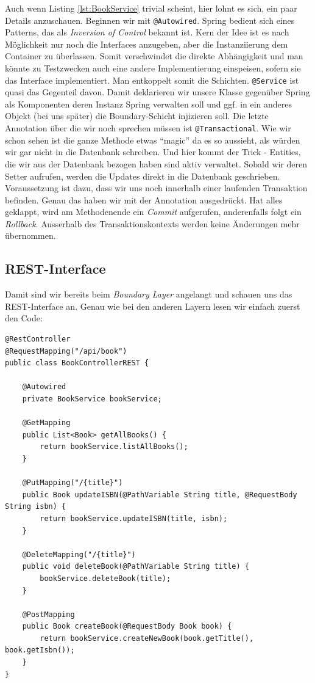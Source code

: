 Auch wenn Listing \ref{lst:BookService} trivial scheint, 
hier lohnt es sich, ein paar Details
anzuschauen. Beginnen wir mit \texttt{@Autowired}. Spring bedient sich
eines Patterns, das als \textit{Inversion of Control} \cite{fowler_2004} 
bekannt ist. Kern der Idee ist es nach Möglichkeit nur noch die Interfaces
anzugeben, aber die Instanziierung dem Container zu überlassen. Somit
verschwindet die direkte Abhängigkeit und man könnte zu Testzwecken 
auch eine andere Implementierung einspeisen, sofern sie das Interface
implementiert. Man entkoppelt somit die Schichten.
\texttt{@Service} ist quasi das Gegenteil davon. Damit deklarieren wir 
unsere Klasse gegenüber Spring als Komponenten deren Instanz Spring
verwalten soll und ggf. in ein anderes Objekt (bei uns später) die
Boundary-Schicht injizieren soll. Die letzte Annotation über die wir
noch sprechen müssen ist \texttt{@Transactional}. Wie wir schon
sehen ist die ganze Methode etwas ``magic'' da es so aussieht, als
würden wir gar nicht in die Datenbank schreiben. Und hier kommt der
Trick - Entities, die wir aus der Datenbank bezogen haben sind 
aktiv verwaltet. Sobald wir deren Setter aufrufen, werden die Updates
direkt in die Datenbank geschrieben. Voraussetzung ist dazu, dass wir
uns noch innerhalb einer laufenden Transaktion befinden. Genau 
das haben wir mit der Annotation ausgedrückt. Hat alles geklappt, 
wird am Methodenende ein \textit{Commit} aufgerufen, anderenfalls
folgt ein \textit{Rollback}. Ausserhalb des Transaktionskontexts
werden keine Änderungen mehr übernommen.

\subsection{REST-Interface}

Damit sind wir bereits beim \textit{Boundary Layer} angelangt und schauen
uns das REST-Interface an. Genau wie bei den anderen Layern lesen wir 
einfach zuerst den Code:

\begin{listing}[H]
\begin{verbatim}
@RestController
@RequestMapping("/api/book")
public class BookControllerREST {
    
    @Autowired
    private BookService bookService;

    @GetMapping
    public List<Book> getAllBooks() {
        return bookService.listAllBooks();
    }

    @PutMapping("/{title}")
    public Book updateISBN(@PathVariable String title, @RequestBody String isbn) {
        return bookService.updateISBN(title, isbn);
    }

    @DeleteMapping("/{title}")
    public void deleteBook(@PathVariable String title) {
        bookService.deleteBook(title);
    }

    @PostMapping
    public Book createBook(@RequestBody Book book) {
        return bookService.createNewBook(book.getTitle(), book.getIsbn());
    }
}
\end{verbatim}
\caption{BookControllerREST.java}
\label{lst:BookControllerREST}
\end{listing}

